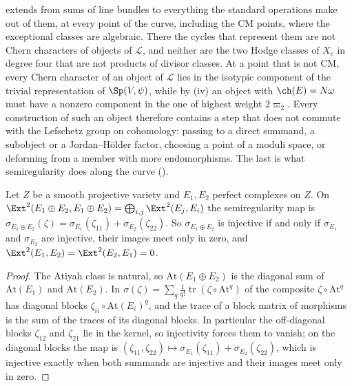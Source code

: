 \begin{remark}
\label{rem:leavel}
 extends  from sums of
line bundles to everything the standard operations make out of them, at every
point of the curve, including the CM points, where the exceptional classes
are algebraic. There the cycles that represent them are not Chern characters
of objects of $\mathcal{L}$, and neither are the two Hodge classes of $X_{c}$
in degree four that are not products of divisor classes. At a point that is
not CM, every Chern character of an object of $\mathcal{L}$ lies in the
isotypic component of the trivial representation of $\Sp(V,\psi)$, while by
(iv) an object with $\ch(E)=N\omega$ must have a
nonzero component in the one of highest weight $2\varpi_{2}$. Every
construction of such an object therefore contains a step that does not commute with the Lefschetz group on
cohomology: passing to a direct summand, a subobject or a Jordan--H\"older
factor, choosing a point of a moduli space, or deforming from a member with
more endomorphisms. The last is what semiregularity does along the curve
().
\end{remark}

\begin{lemma}\label{lem:semiregsum}
Let $Z$ be a smooth projective variety and $E_{1},E_{2}$ perfect complexes on
$Z$. On $\Ext^{2}(E_{1}\oplus E_{2},E_{1}\oplus E_{2})=\bigoplus_{i,j}
\Ext^{2}(E_{j},E_{i})$ the semiregularity map is
$\sigma_{E_{1}\oplus E_{2}}(\zeta)=\sigma_{E_{1}}(\zeta_{11})
+\sigma_{E_{2}}(\zeta_{22})$. So $\sigma_{E_{1}\oplus E_{2}}$ is injective if
and only if $\sigma_{E_{1}}$ and $\sigma_{E_{2}}$ are injective, their images
meet only in zero, and $\Ext^{2}(E_{1},E_{2})=\Ext^{2}(E_{2},E_{1})=0$.
\end{lemma}

\begin{proof}
The Atiyah class is natural, so $\mathrm{At}(E_{1}\oplus E_{2})$ is the
diagonal sum of $\mathrm{At}(E_{1})$ and $\mathrm{At}(E_{2})$. In
$\sigma(\zeta)=\sum_{q}\frac1{q!}\operatorname{tr}(\zeta\circ\mathrm{At}^{q})$
of  the composite $\zeta\circ\mathrm{At}^{q}$ has diagonal blocks
$\zeta_{ii}\circ\mathrm{At}(E_{i})^{q}$, and the trace of a block matrix of
morphisms is the sum of the traces of its diagonal blocks. In particular the
off-diagonal blocks $\zeta_{12}$ and $\zeta_{21}$ lie in the kernel, so
injectivity forces them to vanish; on the diagonal blocks the map is
$(\zeta_{11},\zeta_{22})\mapsto\sigma_{E_{1}}(\zeta_{11})+\sigma_{E_{2}}
(\zeta_{22})$, which is injective exactly when both summands are injective
and their images meet only in zero.
\end{proof}

